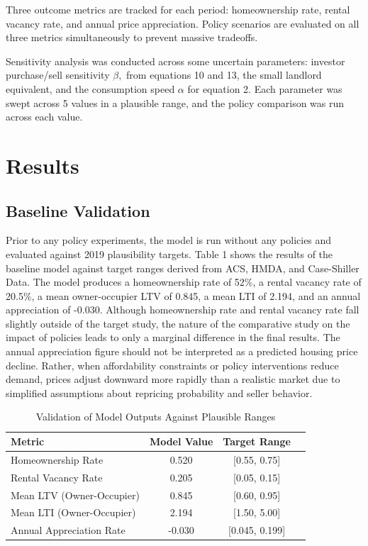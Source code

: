 \documentclass[twocolumn,showpacs,%
  nofootinbib,aps,superscriptaddress,%
  eqsecnum,prd,notitlepage,showkeys,10pt]{revtex4-1}
\begin{document}
Three outcome metrics are tracked for each period: homeownership rate, rental vacancy rate, and annual price appreciation. Policy scenarios are evaluated on all three metrics simultaneously to prevent massive tradeoffs. \newline

Sensitivity analysis was conducted across some uncertain parameters: investor purchase/sell sensitivity $\beta,$ from equations 10 and 13, the small landlord equivalent, and the consumption speed $\alpha$ for equation 2. Each parameter was swept across 5 values in a plausible range, and the policy comparison was run across each value. \newline



\section{Results}
\subsection{Baseline Validation}
Prior to any policy experiments, the model is run without any policies and evaluated against 2019 plausibility targets. Table 1 shows the results of the baseline model against target ranges derived from ACS, HMDA, and Case-Shiller Data. The model produces a homeownership rate of 52\%, a rental vacancy rate of 20.5\%, a mean owner-occupier LTV of 0.845, a mean LTI of 2.194, and an annual appreciation of -0.030. Although homeownership rate and rental vacancy rate fall slightly outside of the target study, the nature of the comparative study on the impact of policies leads to only a marginal difference in the final results. The annual appreciation figure should not be interpreted as a predicted housing price decline. Rather, when affordability constraints or policy interventions reduce demand, prices adjust downward more rapidly than a realistic market due to simplified assumptions about repricing probability and seller behavior. 

\begin{table}[H]
\centering
\label{tab:validation}
\caption{Validation of Model Outputs Against Plausible Ranges}

\begin{tabular}{lccc}
\hline
\textbf{Metric} & \textbf{Model Value} & \textbf{Target Range} \\
\hline
Homeownership Rate & 0.520 & [0.55, 0.75]\\
Rental Vacancy Rate & 0.205 & [0.05, 0.15] \\
Mean LTV (Owner-Occupier) & 0.845 & [0.60, 0.95] \\
Mean LTI (Owner-Occupier) & 2.194 & [1.50, 5.00] \\
Annual Appreciation Rate & -0.030 & [0.045, 0.199]\\
\hline

\end{tabular}
\end{table}
\end{document}

